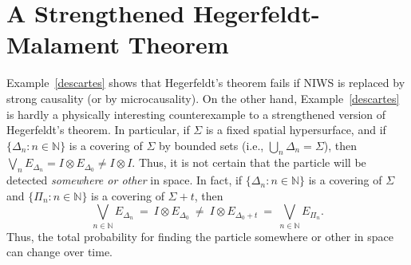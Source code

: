 \documentclass[11pt]{article}
\theoremstyle{remark}
\begin{document}
\section{A Strengthened Hegerfeldt-Malament Theorem} \label{main}
Example~\ref{descartes} shows that Hegerfeldt's theorem fails if NIWS
is replaced by strong causality (or by microcausality).  On the other
hand, Example~\ref{descartes} is hardly a physically interesting
counterexample to a strengthened version of Hegerfeldt's theorem.  In
particular, if $\Sigma$ is a fixed spatial hypersurface, and if $\{
\Delta _{n}:n\in \mathbb{N} \}$ is a covering of $\Sigma$ by bounded
sets (i.e., $\bigcup _{n}\Delta _{n}=\Sigma$), then $\bigvee
_{n}E_{\Delta _{n}}=I\otimes E_{\Delta _{0}}\neq I\otimes I$.  Thus,
it is not certain that the particle will be detected \emph{somewhere
  or other} in space.  In fact, if $\{ \Delta _{n}:n\in \mathbb{N}\}$
is a covering of $\Sigma$ and $\{ \Pi _{n}:n\in \mathbb{N}\}$ is a
covering of $\Sigma +t$, then \begin{equation} \bigvee _{n\in
    \mathbb{N}}E_{\Delta_{n}}\:=\:I\otimes E_{\Delta _{0}}\:\neq \:
  I\otimes E_{\Delta _{0}+t}\:=\:\bigvee _{n\in \mathbb{N}}E_{\Pi
    _{n}} .\end{equation} Thus, the total probability for finding the
particle somewhere or other in space can change over time.
\end{document}

